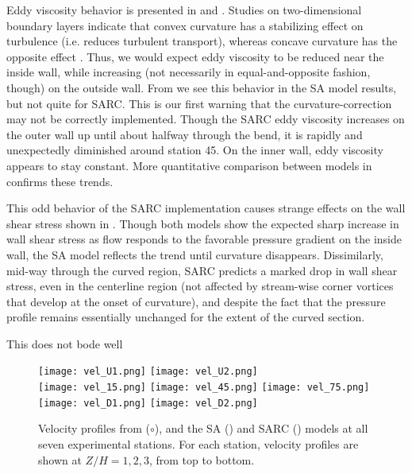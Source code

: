 \documentclass[11pt]{article}
\begin{document}
Eddy viscosity behavior is presented in  and . Studies on two-dimensional boundary layers indicate that convex curvature has a stabilizing effect on turbulence (i.e. reduces turbulent transport), whereas concave curvature has the opposite effect \citep{kim1994}. Thus, we would expect eddy viscosity to be reduced near the inside wall, while increasing (not necessarily in equal-and-opposite fashion, though) on the outside wall. From  we see this behavior in the SA model results, but not quite for SARC. This is our first warning that the curvature-correction may not be correctly implemented. Though the SARC eddy viscosity increases on the outer wall up until about halfway through the bend, it is rapidly and unexpectedly diminished around station 45. On the inner wall, eddy viscosity appears to stay constant. More quantitative comparison between models in  confirms these trends.

This odd behavior of the SARC implementation causes strange effects on the wall shear stress shown in . Though both models show the expected sharp increase in wall shear stress as flow responds to the favorable pressure gradient on the inside wall, the SA model reflects the trend until curvature disappears. Dissimilarly, mid-way through the curved region, SARC predicts a marked drop in wall shear stress, even in the centerline region (not affected by stream-wise corner vortices that develop at the onset of curvature), and despite the fact that the pressure profile remains essentially unchanged for the extent of the curved section.

This does not bode well

\begin{figure}[p]
\centering
\texttt{[image: vel\_U1.png]}
\texttt{[image: vel\_U2.png]}\\
\texttt{[image: vel\_15.png]}
\texttt{[image: vel\_45.png]}
\texttt{[image: vel\_75.png]}\\
\texttt{[image: vel\_D1.png]}
\texttt{[image: vel\_D2.png]}
\caption{Velocity profiles from \citet{kim1994} ($\circ$), and the SA ({\color{blue}\solidrule[6mm]}) and SARC ({\color{red}\dashrule}) models at all seven experimental stations. For each station, velocity profiles are shown at $Z/H = 1, 2, 3$, from top to bottom.}
\label{fig:velocity_slices}
\end{figure}
\end{document}
